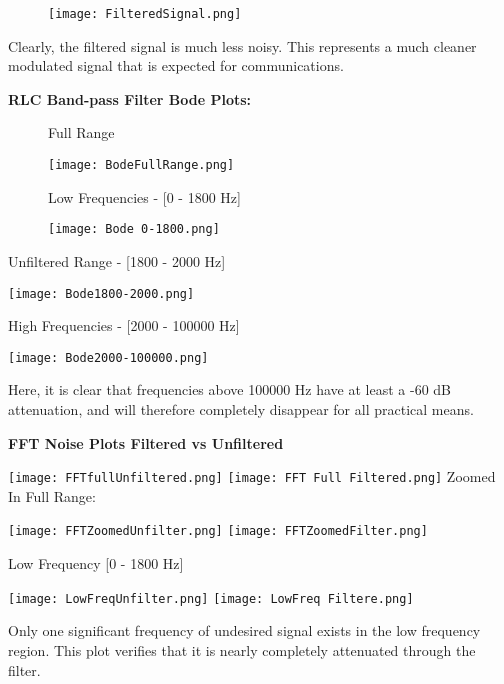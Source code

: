 \documentclass[hidelinks, 12pt]{report}
\begin{document}
    \begin{figure}[!h]
    \centering
    \texttt{[image: FilteredSignal.png]}
    \end{figure}
    \newpage
    Clearly, the filtered signal is much less noisy. This represents a much cleaner modulated signal that is expected for communications.

\textbf{RLC Band-pass Filter Bode Plots: }
    
    \begin{figure}[!h]
    
    Full Range
    
    \texttt{[image: BodeFullRange.png]}
    \end{figure}
    
    \begin{figure}[!h]
    
    Low Frequencies - [0 - 1800 Hz]
    
    \texttt{[image: Bode 0-1800.png]}
    \end{figure}
    


    Unfiltered Range - [1800 - 2000 Hz]
    
    \texttt{[image: Bode1800-2000.png]}

  
    
  \newpage
    High Frequencies - [2000 - 100000 Hz]
    
    \texttt{[image: Bode2000-100000.png]}
  
  Here, it is clear that frequencies above 100000 Hz have at least a -60 dB attenuation, and will therefore completely disappear for all practical means.

\textbf{FFT Noise Plots Filtered vs Unfiltered}

    \texttt{[image: FFTfullUnfiltered.png]}
    \texttt{[image: FFT Full Filtered.png]}
    \newpage
Zoomed In Full Range: 

    \texttt{[image: FFTZoomedUnfilter.png]}
    \texttt{[image: FFTZoomedFilter.png]}
    
Low Frequency [0 - 1800 Hz]

    \texttt{[image: LowFreqUnfilter.png]}
    \texttt{[image: LowFreq Filtere.png]}
    
    Only one significant frequency of undesired signal exists in the low frequency region. This plot verifies that it is nearly completely attenuated through the filter.
    
\end{document}
